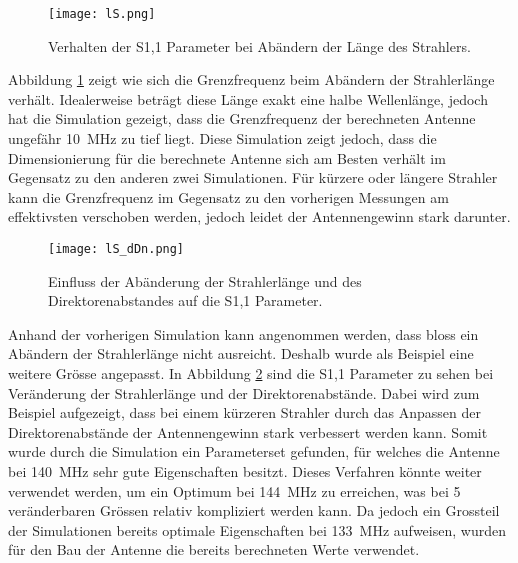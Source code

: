 \begin{figure}[h!]
	\centering
	\texttt{[image: lS.png]}
	\caption{Verhalten der S1,1 Parameter bei Abändern der Länge des Strahlers.}
	\label{fig:Simulation_lS}
\end{figure}

Abbildung \ref{fig:Simulation_lS} zeigt wie sich die Grenzfrequenz beim Abändern der Strahlerlänge verhält. Idealerweise beträgt diese Länge exakt eine halbe Wellenlänge, jedoch hat die Simulation gezeigt, dass die Grenzfrequenz der berechneten Antenne ungefähr \SI{10}{MHz} zu tief liegt. Diese Simulation zeigt jedoch, dass die Dimensionierung für die berechnete Antenne sich am Besten verhält im Gegensatz zu den anderen zwei Simulationen. Für kürzere oder längere Strahler kann die Grenzfrequenz im Gegensatz zu den vorherigen Messungen am effektivsten verschoben werden, jedoch leidet der Antennengewinn stark darunter.

\begin{figure}[h!]
	\centering
	\texttt{[image: lS\_dDn.png]}
	\caption{Einfluss der Abänderung der Strahlerlänge und des Direktorenabstandes auf die S1,1 Parameter.}
	\label{fig:Simulation_lS_dDn}
\end{figure}

Anhand der vorherigen Simulation kann angenommen werden, dass bloss ein Abändern der Strahlerlänge nicht ausreicht. Deshalb wurde als Beispiel eine weitere Grösse angepasst. In Abbildung \ref{fig:Simulation_lS_dDn} sind die S1,1 Parameter zu sehen bei Veränderung der Strahlerlänge und der Direktorenabstände. Dabei wird zum Beispiel aufgezeigt, dass bei einem kürzeren Strahler durch das Anpassen der Direktorenabstände der Antennengewinn stark verbessert werden kann. Somit wurde durch die Simulation ein Parameterset gefunden, für welches die Antenne bei \SI{140}{MHz} sehr gute Eigenschaften besitzt. Dieses Verfahren könnte weiter verwendet werden, um ein Optimum bei \SI{144}{MHz} zu erreichen, was bei 5 veränderbaren Grössen relativ kompliziert werden kann. Da jedoch ein Grossteil der Simulationen bereits optimale Eigenschaften bei \SI{133}{MHz} aufweisen, wurden für den Bau der Antenne die bereits berechneten Werte verwendet.
